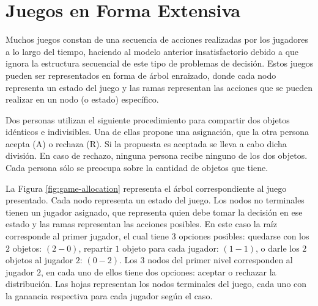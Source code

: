 \chapter{Juegos en Forma Extensiva}
\label{chapter:juegos-forma-extensiva}

Muchos juegos constan de una secuencia de acciones realizadas por los jugadores a lo largo del tiempo, haciendo al modelo anterior insatisfactorio debido a que ignora la estructura secuencial de este tipo de problemas de decisión. Estos juegos pueden ser representados en forma de árbol enraizado, donde cada nodo representa un estado del juego y las ramas representan las acciones que se pueden realizar en un nodo (o estado) específico. 

\begin{example}
\label{ex:game-allocation}
Dos personas utilizan el siguiente procedimiento para compartir dos objetos idénticos e indivisibles. Una de ellas propone una asignación, que la otra persona acepta (A) o rechaza (R). Si la propuesta es aceptada se lleva a cabo dicha división. En caso de rechazo, ninguna persona recibe ninguno de los dos objetos. Cada persona sólo se preocupa sobre la cantidad de objetos que tiene. 
\end{example}

La Figura \ref{fig:game-allocation} representa el árbol correspondiente al juego presentado. Cada nodo representa un estado del juego. Los nodos no terminales tienen un jugador asignado, que representa quien debe tomar la decisión en ese estado y las ramas representan las acciones posibles. En este caso la raíz corresponde al primer jugador, el cual tiene $3$ opciones posibles: quedarse con los $2$ objetos: $(2-0)$, repartir $1$ objeto para cada jugador: $(1-1)$, o darle los $2$ objetos al jugador $2$: $(0-2)$. Los $3$ nodos del primer nivel corresponden al jugador $2$, en cada uno de ellos tiene dos opciones: aceptar o rechazar la distribución. Las hojas representan los nodos terminales del juego, cada uno con la ganancia respectiva para cada jugador según el caso.

